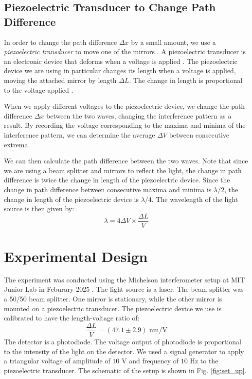 \subsection{Piezoelectric Transducer to Change Path Difference}
In order to change the path difference $\Delta x$ by a small amount, we use a \textit{piezoelectric transducer} to move one of the mirrors \cite{MITOpticalInterferometry2023}. A piezoelectric transducer is an electronic device that deforms when a voltage is applied \cite{PiezoFilm2006}. The piezoelectric device we are using in particular changes its length when a voltage is applied, moving the attached mirror by length $\Delta L$.  The change in length is proportional to the voltage applied \cite{MITOpticalInterferometry2023}. 

When we apply different voltages to the piezoelectric device, we change the path difference $\Delta x$ between the two waves, changing the interference pattern as a result. By recording the voltage corresponding to the maxima and minima of the interference pattern, we can determine the average $\Delta V$ between consecutive extrema. 

We can then calculate the path difference between the two waves. Note that since we are using a beam splitter and mirrors to reflect the light, the change in path difference is twice the change in length of the piezoelectric device. Since the change in path difference between consecutive maxima and minima is $\lambda/2$, the change in length of the piezoelectric device is $\lambda/4$.
The wavelength of the light source is then given by:
\begin{equation}
    \lambda = 4 \Delta V \times \frac{\Delta L}{V} 
    \label{eq:wavelength}
\end{equation}


\section{Experimental Design}
The experiment was conducted using the Michelson interferometer setup at MIT Junior Lab in Feburary 2025 \cite{MITOpticalInterferometry2023}. The light source is a laser. The beam splitter was a 50/50 beam splitter. One mirror is stationary, while the other mirror is mounted on a piezoelectric transducer. The piezoelectric device we use is calibrated to have the length-voltage ratio of:
\begin{equation}
     \frac{\Delta L}{V} = (47.1\pm2.9) \text{ nm/V}
     \label{eq:calibration}
\end{equation}
The detector is a photodiode. The voltage output of photodiode is proportional to the intensity of the light on the detector. We used a signal generator to apply a triangular voltage of amplitude of $10 \text{ V}$ and frequency of $10 \text{ Hz}$ to the piezoelectric transducer. The schematic of the setup is shown in Fig. \ref{fig:set_up}.

